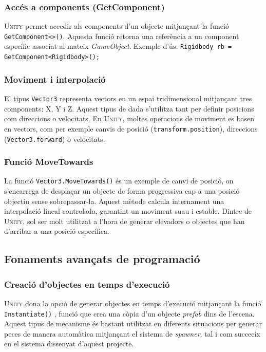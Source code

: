 \documentclass[a4paper,11pt,DIV=13,headings=normal,abstract=true,twoside=semi]{article}
\newcommand{\acro}[1]{\textsc{#1}}
\begin{document}
\subsubsection{Accés a components (GetComponent)}

\acro{Unity} permet accedir als components \cite{UnityComponents} d'un objecte mitjançant la funció \texttt{GetComponent<>()}. Aquesta funció retorna una referència a un component específic associat al mateix \emph{GameObject}. Exemple d'ús: \texttt{Rigidbody rb = GetComponent<Rigidbody>();}

\subsubsection{Moviment i interpolació}

El tipus \texttt{Vector3} representa vectors en un espai tridimensional mitjançant tres components: X, Y i Z. Aquest tipus de dada s'utilitza tant per definir posicions com direccions o velocitats. En \acro{Unity}, moltes operacions de moviment es basen en vectors, com per exemple canvis de posició (\texttt{transform.position}), direccions (\texttt{Vector3.forward}) o velocitats.

\subsubsection*{Funció MoveTowards}

La funció \texttt{Vector3.MoveTowards()} \cite{UnityMoveTowards} és un exemple de canvi de posició, on s'encarrega de desplaçar un objecte de forma progressiva cap a una posició objectiu sense sobrepassar-la. Aquest mètode calcula internament una interpolació lineal controlada, garantint un moviment suau i estable. Dintre de \acro{Unity}, sol ser molt utilitzat a l'hora de generar elevadors o  objectes que han d'arribar a una posició específica.

\subsection{Fonaments avançats de programació}

\subsubsection{Creació d'objectes en temps d'execució}

\acro{Unity} dona la opció de generar objectes en temps d'execució mitjançant la funció \texttt{Instantiate()} \cite{UnityInstantiate}, funció que crea una còpia d'un objecte \emph{prefab} dins de l'escena. Aquest tipus de mecanisme és bastant utilitzat en diferents situacions per generar peces de manera automàtica mitjançant el sistema de \emph{spawner}, tal i com succeeix en el sistema dissenyat d'aquest projecte.
\end{document}
